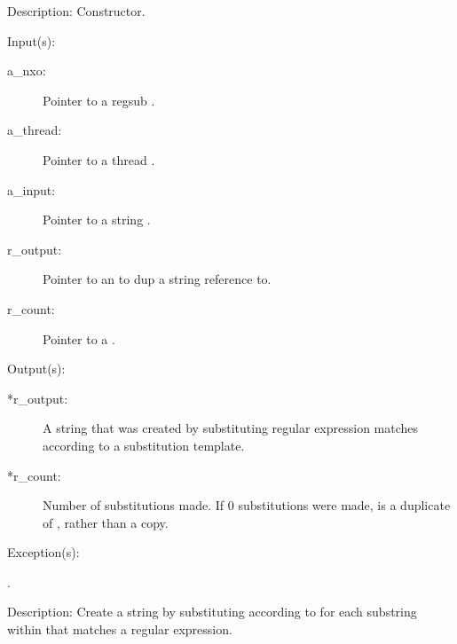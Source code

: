 \begin{capi}
\begin{capilist}
	\item[Description: ]
		Constructor.
	\end{capilist}
\label{nxo_regsub_subst}
	\begin{capilist}
	\item[Input(s): ]
		\begin{description}\item[]
		\item[a\_nxo: ]
			Pointer to a regsub .
		\item[a\_thread: ]
			Pointer to a thread .
		\item[a\_input: ]
			Pointer to a string .
		\item[r\_output: ]
			Pointer to an  to dup a string reference
			to.
		\item[r\_count: ]
			Pointer to a .
		\end{description}
	\item[Output(s): ]
		\begin{description}\item[]
		\item[*r\_output: ]
			A string that was created by substituting regular
			expression matches according to a substitution template.
		\item[*r\_count: ]
			Number of substitutions made.  If 0 substitutions were
			made,  is a duplicate of
			, rather than a copy.
		\end{description}
	\item[Exception(s): ]
		\begin{description}\item[]
		\item[.]
		\end{description}
	\item[Description: ]
		Create a string by substituting according to 
		for each substring within  that matches a regular
		expression.


\end{capilist}
\end{capi}

